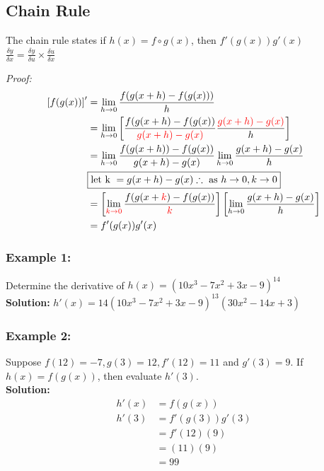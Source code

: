 \documentclass{article}
\begin{document}
\subsection{Chain Rule}
\begin{tcolorbox}[colback=OliveGreen!5!snow, colframe=white!50!white,
  colbacktitle=OliveGreen!75!mistyrose, title=Chain Rule]
The chain rule states 
if $h(x)=f \circ g(x)$, then $f'(g(x))g'(x)$ \\
$\frac{\delta y}{\delta x}=\frac{\delta y}{\delta u} \times \frac{\delta u}{\delta x}$
\end{tcolorbox}
\textit{Proof:}\\
\begin{align*}
\left[f(g(x)) \right]'&=\lim_{h \to 0} \frac{f(g(x+h)-f(g(x)))}{h}\\
&= \lim_{h \to 0} \left[ \frac{f(g(x+h)-f(g(x))}{\textcolor{red}{g(x+h)-g(x)}} \frac{\textcolor{red}{g(x+h)-g(x)}}{h}\right]\\
&=\lim_{h \to 0}\frac{f(g(x+h))-f(g(x))}{g(x+h)-g(x)} \lim_{h \to 0}\frac{g(x+h)-g(x)}{h}\\
&\boxed{\text{let k } = g(x+h)-g(x) \therefore \text{ as } h \to 0, k \to0}\\
&= \left[\lim_{\textcolor{red}{k \to 0}}\frac{f(g(x+\textcolor{red}{k})-f(g(x))}{\textcolor{red}{k}} \right]\left[ \lim_{h \to 0}\frac{g(x+h)-g(x)}{h}\right]\\
&=f'(g(x))g'(x)
\end{align*}
\subsubsection*{Example 1:}
Determine the derivative of $h(x)=(10x^3-7x^2+3x-9)^{14}$\\
\textbf{Solution:}
$h'(x)=14(10x^3-7x^2+3x-9)^{13}(30x^2-14x+3)$
\subsubsection*{Example 2:}
Suppose $f(12)=-7, g(3)=12, f'(12)=11$ and $g'(3)=9$. If $h(x)=f(g(x))$, then evaluate $h'(3)$.\\
\textbf{Solution:}
\begin{align*}
    h'(x)&=f(g(x))\\
    h'(3)&=f'(g(3))g'(3)\\
    &=f'(12)(9)\\
    &=(11)(9)\\
    &=99
\end{align*}
\newpage 
\end{document}
